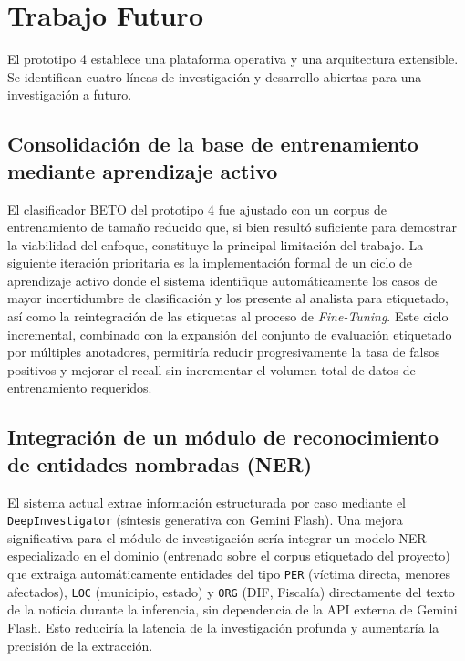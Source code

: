 \section*{Trabajo Futuro}
\label{sec:conc_futuro}


El prototipo 4 establece una plataforma operativa y una arquitectura extensible.
Se identifican cuatro líneas de investigación y desarrollo abiertas para una
investigación a futuro.

\subsection*{Consolidación de la base de entrenamiento mediante aprendizaje activo}
\label{subsec:fut_activelearning}

El clasificador BETO del prototipo 4 fue ajustado con un corpus de entrenamiento
de tamaño reducido que, si bien resultó suficiente para demostrar la viabilidad
del enfoque, constituye la principal limitación del trabajo. La siguiente iteración
prioritaria es la implementación formal de un ciclo de aprendizaje activo donde
el sistema identifique automáticamente los casos de mayor incertidumbre de
clasificación y los presente al analista para etiquetado, así como la
reintegración de las etiquetas al proceso de \textit{Fine-Tuning}.
Este ciclo incremental, combinado con la expansión del conjunto de evaluación
etiquetado por múltiples anotadores, permitiría reducir progresivamente la
tasa de falsos positivos y mejorar el recall sin incrementar el volumen total
de datos de entrenamiento requeridos.

\subsection*{Integración de un módulo de reconocimiento de entidades nombradas (NER)}
\label{subsec:fut_ner}

El sistema actual extrae información estructurada por caso mediante el
\texttt{DeepInvestigator} (síntesis generativa con Gemini Flash). Una mejora
significativa para el módulo de investigación sería integrar un modelo NER especializado en
el dominio (entrenado sobre el corpus etiquetado del proyecto) que extraiga
automáticamente entidades del tipo \texttt{PER} (víctima directa, menores
afectados), \texttt{LOC} (municipio, estado) y \texttt{ORG} (DIF, Fiscalía)
directamente del texto de la noticia durante la inferencia, sin dependencia
de la API externa de Gemini Flash. Esto reduciría la latencia de la investigación
profunda y aumentaría la precisión de la extracción.

